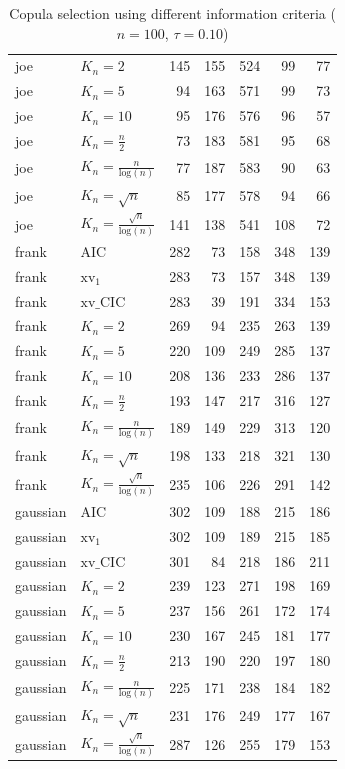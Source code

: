 \begin{table}[htbp]
\begin{tabular}{llrrrrr}
  joe & $K_{n}=2$ & 145 & 155 & 524 & 99 & 77 \\ 
  joe & $K_{n}=5$ & 94 & 163 & 571 & 99 & 73 \\ 
  joe & $K_{n}=10$ & 95 & 176 & 576 & 96 & 57 \\ 
  joe & $K_{n}=\tfrac{n}{2}$ & 73 & 183 & 581 & 95 & 68 \\ 
  joe & $K_{n}=\tfrac{n}{\text{log}(n)}$ & 77 & 187 & 583 & 90 & 63 \\ 
  joe & $K_{n}=\sqrt{n}$ & 85 & 177 & 578 & 94 & 66 \\ 
  joe & $K_{n}=\tfrac{\sqrt{n}}{\text{log}(n)}$ & 141 & 138 & 541 & 108 & 72 \\ 
   \hdashline
frank & AIC & 282 & 73 & 158 & 348 & 139 \\ 
  frank & $\text{xv}_{1}$ & 283 & 73 & 157 & 348 & 139 \\ 
  frank & $\text{xv}\_\text{CIC}$ & 283 & 39 & 191 & 334 & 153 \\ 
  frank & $K_{n}=2$ & 269 & 94 & 235 & 263 & 139 \\ 
  frank & $K_{n}=5$ & 220 & 109 & 249 & 285 & 137 \\ 
  frank & $K_{n}=10$ & 208 & 136 & 233 & 286 & 137 \\ 
  frank & $K_{n}=\tfrac{n}{2}$ & 193 & 147 & 217 & 316 & 127 \\ 
  frank & $K_{n}=\tfrac{n}{\text{log}(n)}$ & 189 & 149 & 229 & 313 & 120 \\ 
  frank & $K_{n}=\sqrt{n}$ & 198 & 133 & 218 & 321 & 130 \\ 
  frank & $K_{n}=\tfrac{\sqrt{n}}{\text{log}(n)}$ & 235 & 106 & 226 & 291 & 142 \\ 
   \hdashline
gaussian & AIC & 302 & 109 & 188 & 215 & 186 \\ 
  gaussian & $\text{xv}_{1}$ & 302 & 109 & 189 & 215 & 185 \\ 
  gaussian & $\text{xv}\_\text{CIC}$ & 301 & 84 & 218 & 186 & 211 \\ 
  gaussian & $K_{n}=2$ & 239 & 123 & 271 & 198 & 169 \\ 
  gaussian & $K_{n}=5$ & 237 & 156 & 261 & 172 & 174 \\ 
  gaussian & $K_{n}=10$ & 230 & 167 & 245 & 181 & 177 \\ 
  gaussian & $K_{n}=\tfrac{n}{2}$ & 213 & 190 & 220 & 197 & 180 \\ 
  gaussian & $K_{n}=\tfrac{n}{\text{log}(n)}$ & 225 & 171 & 238 & 184 & 182 \\ 
  gaussian & $K_{n}=\sqrt{n}$ & 231 & 176 & 249 & 177 & 167 \\ 
  gaussian & $K_{n}=\tfrac{\sqrt{n}}{\text{log}(n)}$ & 287 & 126 & 255 & 179 & 153 \\ 
   \hline
\end{tabular}
\caption{Copula selection using different information criteria ($n = 100$, $\tau = 0.10$)} 
\end{table}


